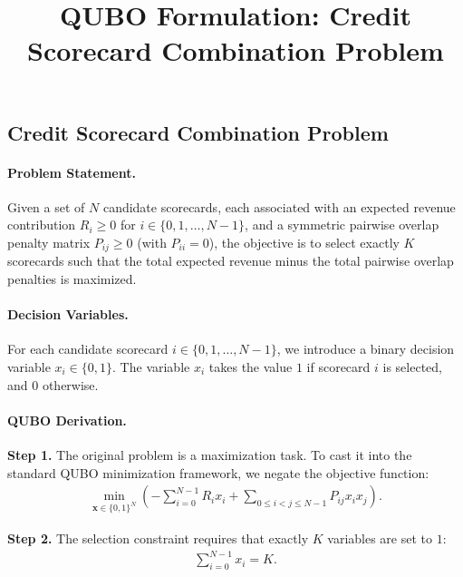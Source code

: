 \documentclass[12pt]{article}
\title{QUBO Formulation: Credit Scorecard Combination Problem}
\date{}
\begin{document}
\maketitle

\subsection*{Credit Scorecard Combination Problem}

\paragraph{Problem Statement.}
Given a set of $N$ candidate scorecards, each associated with an expected revenue contribution $R_i \ge 0$ for $i \in \{0, 1, \dots, N-1\}$, and a symmetric pairwise overlap penalty matrix $P_{ij} \ge 0$ (with $P_{ii} = 0$), the objective is to select exactly $K$ scorecards such that the total expected revenue minus the total pairwise overlap penalties is maximized.

\paragraph{Decision Variables.}
For each candidate scorecard $i \in \{0, 1, \dots, N-1\}$, we introduce a binary decision variable $x_i \in \{0,1\}$. The variable $x_i$ takes the value $1$ if scorecard $i$ is selected, and $0$ otherwise.

\paragraph{QUBO Derivation.}
\textbf{Step 1.} The original problem is a maximization task. To cast it into the standard QUBO minimization framework, we negate the objective function:
\begin{align}
    \min_{\mathbf{x} \in \{0,1\}^N} \left( -\sum_{i=0}^{N-1} R_i x_i + \sum_{0 \le i < j \le N-1} P_{ij} x_i x_j \right).
\end{align}

\textbf{Step 2.} The selection constraint requires that exactly $K$ variables are set to $1$:
\begin{align}
    \sum_{i=0}^{N-1} x_i = K.
\end{align}
\end{document}

